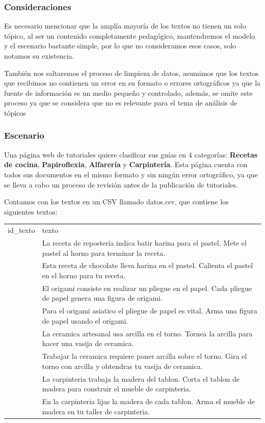 \documentclass[
  spanish,
  letterpaper,
  DIV=11,
  numbers=noendperiod]{scrartcl}
\begin{document}
\subsubsection{Consideraciones}\label{consideraciones}

Es necesario mencionar que la amplía mayoría de los textos no tienen un
solo tópico, al ser un contenido completamente pedagógico, mantendremos
el modelo y el escenario bastante simple, por lo que no consideramos
esos casos, solo notamos su existencia.

También nos saltaremos el proceso de limpieza de datos, asumimos que los
textos que recibimos no contienen un error en su formato o errores
ortográficos ya que la fuente de información es un medio pequeño y
controlado, además, se omite este proceso ya que se considera que no es
relevante para el tema de análisis de tópicos

\subsubsection{Escenario}\label{escenario}

Una página web de tutoriales quiere clasificar sus guías en 4
categorías: \textbf{Recetas de cocina}, \textbf{Papiroflexia},
\textbf{Alfarería} y \textbf{Carpintería}. Esta página cuenta con todos
sus documentos en el mismo formato y sin ningún error ortográfico, ya
que se lleva a cabo un proceso de revisión antes de la publicación de
tutoriales.

Contamos con los textos en un CSV llamado datos.csv, que contiene los
siguientes textos:

\begin{longtable}[]{@{}
  >{\raggedright\arraybackslash}p{}
  >{\raggedright\arraybackslash}p{}@{}}
\toprule\noalign{}
\endhead
\bottomrule\noalign{}
\endlastfoot
id\_texto & texto \\
1 & La receta de reposteria indica batir harina para el pastel. Mete el
pastel al horno para terminar la receta. \\
2 & Esta receta de chocolate lleva harina en el pastel. Calienta el
pastel en el horno para tu receta. \\
3 & El origami consiste en realizar un pliegue en el papel. Cada pliegue
de papel genera una figura de origami. \\
4 & Para el origami asiatico el pliegue de papel es vital. Arma una
figura de papel usando el origami. \\
5 & La ceramica artesanal usa arcilla en el torno. Tornea la arcilla
para hacer una vasija de ceramica. \\
6 & Trabajar la ceramica requiere poner arcilla sobre el torno. Gira el
torno con arcilla y obtendras tu vasija de ceramica. \\
7 & La carpinteria trabaja la madera del tablon. Corta el tablon de
madera para construir el mueble de carpinteria. \\
8 & En la carpinteria lijas la madera de cada tablon. Arma el mueble de
madera en tu taller de carpinteria. \\
\end{longtable}
\end{document}
